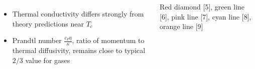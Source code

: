\documentclass[26pt, paperwidth=36in,paperheight=48in]{tikzposter} %
\newcommand{\mysmallerfont}{\fontsize{20}{30}\selectfont}
\begin{document}
\begin{columns}
{\begin{minipage}{0.16\textwidth}
\begin{itemize}
			\item Thermal conductivity differs strongly from theory predictions near $T_c$
			
			\item Prandtl number $\frac{c_P \eta}{\kappa}$, ratio of momentum to thermal diffusivity, remains close to typical $2/3$ value for gases 
		\end{itemize}
		
	\end{minipage}
	\hspace{1cm}

	\vspace{-0.9cm}
	\begin{center}
		\begin{minipage}{0.4\textwidth}
			\mysmallerfont
			\centering 
			Red diamond [5], green line [6], pink line [7], cyan line [8], orange line [9] 
		\end{minipage}
	\end{center}
	
	}

	
	
	
\end{columns}
\end{document}
